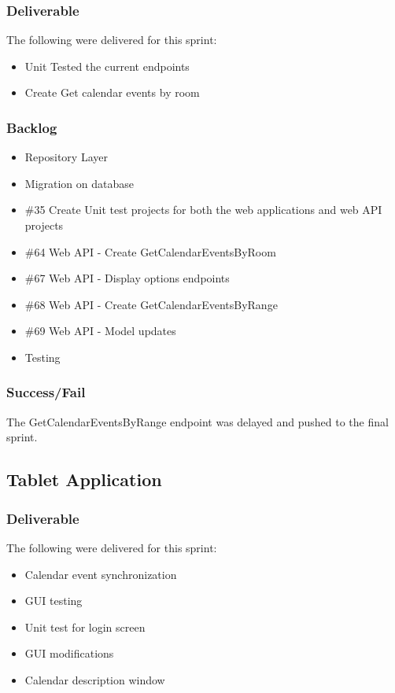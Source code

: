 \subsubsection{Deliverable}
The following were delivered for this sprint:
\begin{itemize}
\item Unit Tested the current endpoints
\item Create Get calendar events by room
\end{itemize}

\subsubsection{Backlog}
\begin{itemize}
\item Repository Layer
\item Migration on database
\item \#35 Create Unit test projects for both the web applications and web API projects
\item \#64 Web API - Create GetCalendarEventsByRoom
\item \#67 Web API - Display options endpoints
\item \#68 Web API - Create GetCalendarEventsByRange
\item \#69 Web API - Model updates
\item Testing
\end{itemize}

\subsubsection{Success/Fail}
The GetCalendarEventsByRange endpoint was delayed and pushed to the final sprint.

\subsection{Tablet Application}
\subsubsection{Deliverable}
The following were delivered for this sprint:
\begin{itemize}
\item Calendar event synchronization
\item GUI testing
\item Unit test for login screen
\item GUI modifications
\item Calendar description window
\end{itemize}
